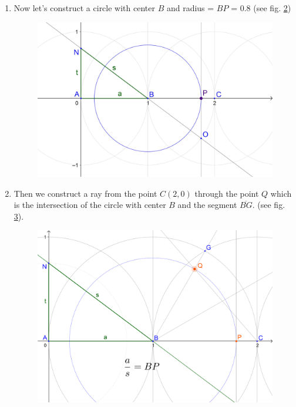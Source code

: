 \documentclass[12pt, letterpaper, oneside]{report}
\begin{document}
\begin{enumerate}
\begin{figure}[h]
	\caption{}
	\label{fig:2_second}
\end{figure}
\vfill
	\item Now let's construct a circle with center $B$ and radius = $BP$ = $0.8$ (see fig. \ref{fig:anbop})\\ 
\begin{figure}[h]
	\centerline{\includegraphics[scale=0.15]{img/anbop.jpg}}
	\caption{}
	\label{fig:anbop}
\end{figure}
\newpage
	\item Then we construct a ray from the point $C(2,0)$ through the point $Q$ which is the intersection of the circle with center $B$ and the segment $\overline{BG}$. (see fig. \ref{fig:anbopq}).
\begin{figure}[h]
	\centerline{\includegraphics[scale=0.15]{img/anbopQ.png}}
	\caption{}
	\label{fig:anbopq}

\end{figure}
\end{enumerate}
\end{document}
